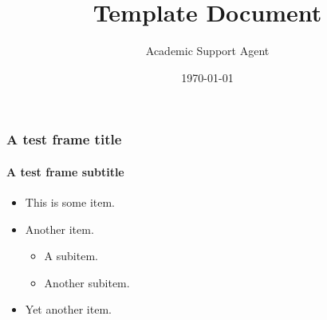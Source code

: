 \documentclass{article}
\title{Template Document}
\author{Academic Support Agent}
\date{\today}
\begin{document}
\maketitle

\begin{frame}[plain]
\maketitle
\end{frame}

\begin{frame}
\frametitle{A test frame title}
\framesubtitle{A test frame subtitle}
\begin{itemize}
  \item This is some item.
  \item Another item.
  \begin{itemize}
    \item A subitem.
    \item Another subitem.
  \end{itemize}
  \item Yet another item.
\end{itemize}

\end{frame}
\end{document}
